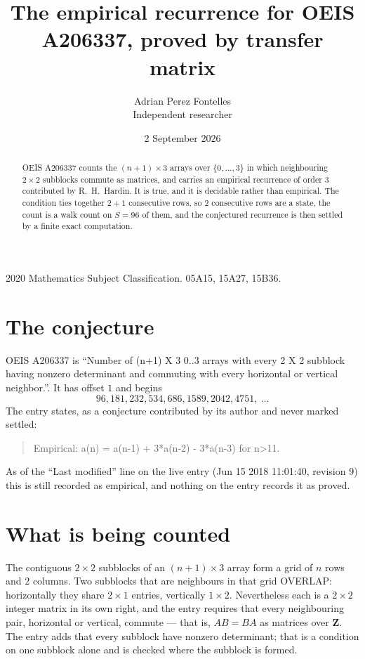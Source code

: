 \documentclass[11pt,a4paper]{article}
\title{The empirical recurrence for OEIS A206337, proved by transfer matrix}
\author{Adrian Perez Fontelles\\ \small Independent researcher}
\date{2 September 2026}
\theoremstyle{plain}
\theoremstyle{definition}
\begin{document}
\maketitle

\begin{abstract}
OEIS A206337 counts the $(n+1)\times3$ arrays over $\{0,\dots,3\}$ in which
neighbouring $2\times2$ subblocks commute as matrices, and carries an empirical recurrence
of order $3$ contributed by R.~H.~Hardin. It is true, and it is decidable rather than
empirical. The condition ties together $2+1$ consecutive rows, so $2$ consecutive rows are
a state, the count is a walk count on $S=96$ of them, and the conjectured recurrence is then
settled by a finite exact computation.
\end{abstract}

\noindent\small 2020 Mathematics Subject Classification. 05A15, 15A27, 15B36.\normalsize

\section{The conjecture}

OEIS A206337 is ``Number of (n+1) X 3 0..3 arrays with every 2 X 2 subblock having nonzero determinant and commuting with every horizontal or vertical neighbor.''. It has offset $1$ and begins
\[
96, 181, 232, 534, 686, 1589, 2042, 4751,\ \dots
\]
The entry states, as a conjecture contributed by its author and never marked settled:
\begin{quote}
Empirical: a(n) = a(n-1) + 3*a(n-2) - 3*a(n-3) for n>11.
\end{quote}
As of the ``Last modified'' line on the live entry (Jun 15 2018 11:01:40, revision 9) this is still
recorded as empirical, and nothing on the entry records it as proved.

\section{What is being counted}

The contiguous $2\times2$ subblocks of an $(n+1)\times3$ array form a grid of $n$
rows and $2$ columns. Two subblocks that are neighbours in that
grid OVERLAP: horizontally they share $2\times1$ entries, vertically
$1\times2$. Nevertheless each is a $2\times2$ integer matrix in its own right, and
the entry requires that every neighbouring pair, horizontal or vertical, commute --- that is,
$AB=BA$ as matrices over $\mathbf{Z}$. The entry adds that every subblock have nonzero determinant; that is a condition on one subblock alone and is checked where the subblock is formed.
\end{document}
